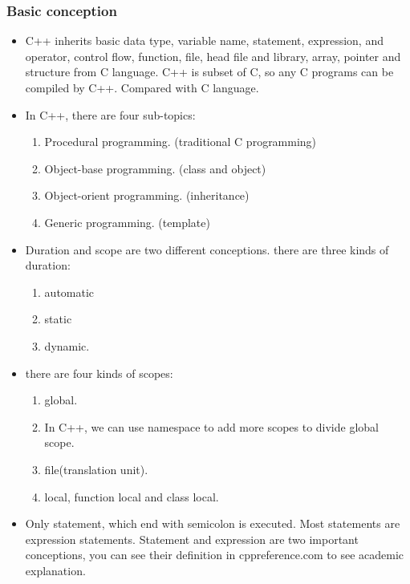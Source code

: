 \documentclass[a4paper,12pt,twoside]{book}
\begin{document}
\subsubsection{Basic conception}
\begin{itemize}
    \item C++ inherits basic data type, variable name, statement, expression, and operator, control flow, function, file, head file and library, array, pointer and structure from C language. C++ is subset of C, so any C programs can be compiled by C++. Compared with C language.
    
    \item In C++, there are four sub-topics: 
    
    \begin{enumerate}
        \item Procedural programming. (traditional C programming)
        \item Object-base programming. (class and object)
        \item Object-orient programming. (inheritance)
        \item Generic programming. (template)
    \end{enumerate}
    
    \item Duration and scope are two different conceptions. there are three kinds of duration:
    \begin{enumerate}
        \item automatic 
        \item static 
        \item dynamic. 
    \end{enumerate}
    
    \item there are four kinds of scopes:
    \begin{enumerate}
        \item global.
        \item In C++, we can use namespace to add more scopes to divide global scope.
        \item file(translation unit).
        \item local, function local and class local. 
    \end{enumerate}
    
    	\item Only statement, which end with semicolon is executed. Most statements are expression statements. Statement and expression are two important conceptions, you can see their definition in cppreference.com to see academic explanation.
    

\end{itemize}
\end{document}
